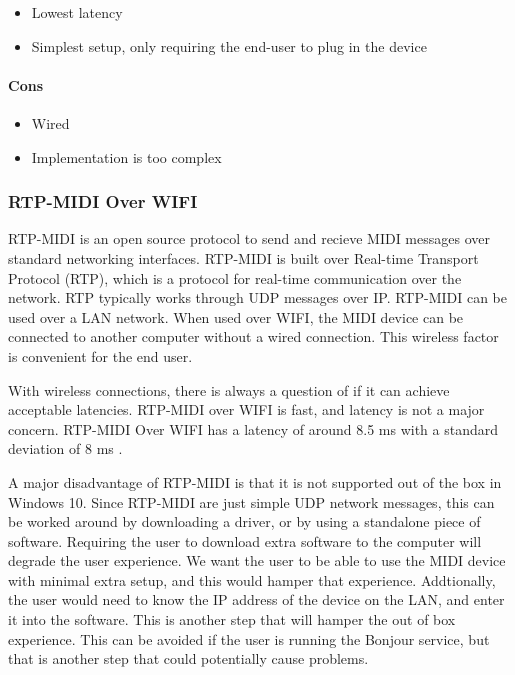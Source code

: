 \begin{itemize}
  \item Lowest latency
  \item Simplest setup, only requiring the end-user to plug in the device
\end{itemize}

\paragraph{Cons}

\begin{itemize}
  \item Wired
  \item Implementation is too complex
\end{itemize}

\subsubsection{RTP-MIDI Over WIFI}

RTP-MIDI is an open source protocol to send and recieve MIDI messages over standard
networking interfaces. RTP-MIDI is built over Real-time Transport Protocol (RTP), which is
a protocol for real-time communication over the network. RTP typically works through UDP
messages over IP. RTP-MIDI can be used over a LAN network. When used over WIFI, the MIDI
device can be connected to another computer without a wired connection. This wireless
factor is convenient for the end user.

With wireless connections, there is always a question of if it can achieve acceptable
latencies. RTP-MIDI over WIFI is fast, and latency is not a major concern. RTP-MIDI Over
WIFI has a latency of around 8.5 ms with a standard deviation of 8 ms
\autocite{ble-latency}.

A major disadvantage of RTP-MIDI is that it is not supported out of the box in Windows 10.
Since RTP-MIDI are just simple UDP network messages, this can be worked around by
downloading a driver, or by using a standalone piece of software. Requiring the user to
download extra software to the computer will degrade the user experience. We want the user
to be able to use the MIDI device with minimal extra setup, and this would hamper that
experience. Addtionally, the user would need to know the IP address of the device on the
LAN, and enter it into the software. This is another step that will hamper the out of box
experience. This can be avoided if the user is running the Bonjour service, but that is
another step that could potentially cause problems.

